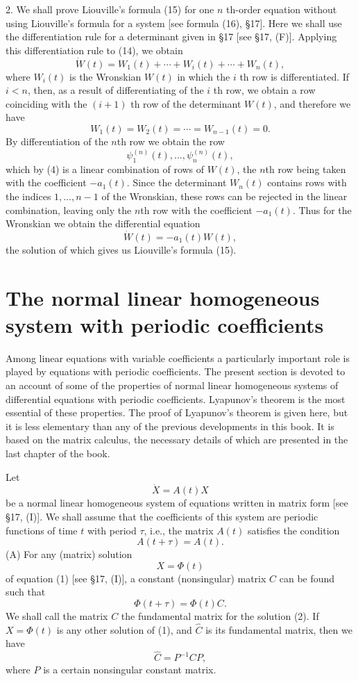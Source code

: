 \documentclass[10pt,a5paper]{book}
\theoremstyle{plain}
\theoremstyle{definition}
\theoremstyle{remark}
\begin{document}
2. We shall prove Liouville's formula (15) for one $n$ th-order equation without using Liouville's formula for a system [see formula (16), §17]. Here we shall use the differentiation rule for a determinant given in §17 [see §17, (F)]. Applying this differentiation rule to (14), we obtain
\[
\dot{W}(t)=W_{1}(t)+\cdots+W_{i}(t)+\cdots+W_{n}(t),
\]
where $W_{i}(t)$ is the Wronskian $W(t)$ in which the $i$ th row is differentiated. If $i<n$, then, as a result of differentiating of the $i$ th row, we obtain a row coinciding with the $(i+1)$ th row of the determinant $W(t)$, and therefore we have
\[
W_{1}(t)=W_{2}(t)=\cdots=W_{n-1}(t)=0 .
\]
By differentiation of the $n$th row we obtain the row
\[
\psi_{1}^{(n)}(t), \ldots, \psi_{n}^{(n)}(t),
\]
which by (4) is a linear combination of rows of $W(t)$, the $n$th row being taken with the coefficient $-a_{1}(t)$. Since the determinant $W_{n}(t)$ contains rows with the indices $1, \ldots, n-1$ of the Wronskian, these rows can be rejected in the linear combination, leaving only the $n$th row with the
coefficient $-a_{1}(t)$. Thus for the Wronskian we obtain the differential equation
\[
\dot{W}(t)=-a_{1}(t) W(t),
\]
the solution of which gives us Liouville's formula (15).

\section{The normal linear homogeneous system with periodic coefficients}
Among linear equations with variable coefficients a particularly important role is played by equations with periodic coefficients. The present section is devoted to an account of some of the properties of normal linear homogeneous systems of differential equations with periodic coefficients. Lyapunov's theorem is the most essential of these properties. The proof of Lyapunov's theorem is given here, but it is less elementary than any of the previous developments in this book. It is based on the matrix calculus, the necessary details of which are presented in the last chapter of the book.

Let
\begin{equation*}
\dot{X}=A(t) X \tag{1}
\end{equation*}
be a normal linear homogeneous system of equations written in matrix form [see §17, (I)]. We shall assume that the coefficients of this system are periodic functions of time $t$ with period $\tau$, i.e., the matrix $A(t)$ satisfies the condition
\[
A(t+\tau)=A(t) .
\]
(A) For any (matrix) solution
\begin{equation*}
X=\Phi(t) \tag{2}
\end{equation*}
of equation (1) [see §17, (I)], a constant (nonsingular) matrix $C$ can be found such that
\[
\Phi(t+\tau)=\Phi(t) C .
\]
We shall call the matrix $C$ the fundamental matrix for the solution (2). If $X=\Phi(t)$ is any other solution of (1), and $\hat{C}$ is its fundamental matrix, then we have
\begin{equation*}
\hat{C}=P^{-1} C P, \tag{3}
\end{equation*}
where $P$ is a certain nonsingular constant matrix.
\end{document}
